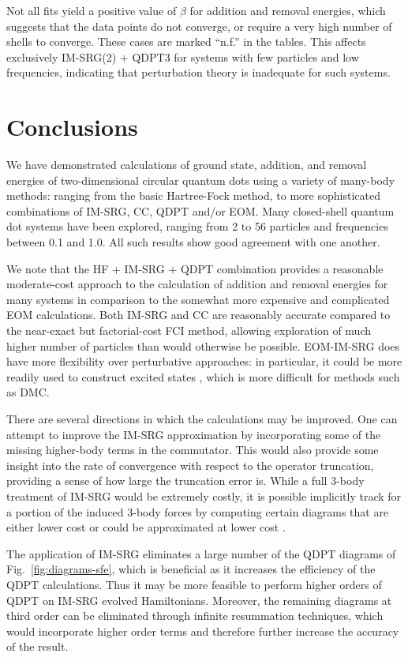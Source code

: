 Not all fits yield a positive value of $\beta$ for addition and
removal energies, which suggests that the data points do not converge,
or require a very high number of shells to converge.  These cases are
marked ``n.f.'' in the tables.  This affects exclusively IM-SRG(2) +
QDPT3 for systems with few particles and low frequencies, indicating
that perturbation theory is inadequate for such systems.

\section{Conclusions}
\label{sec:conclusions}

We have demonstrated calculations of ground state, addition, and
removal energies of two-dimensional circular quantum dots using a
variety of many-body methods: ranging from the basic Hartree-Fock
method, to more sophisticated combinations of IM-SRG, CC, QDPT and/or
EOM.  Many closed-shell quantum dot systems have been explored,
ranging from 2 to 56 particles and frequencies between 0.1 and 1.0.
All such results show good agreement with one another.

We note that the HF + IM-SRG + QDPT combination provides a reasonable
moderate-cost approach to the calculation of addition and removal
energies for many systems in comparison to the somewhat more expensive
and complicated EOM calculations.  Both IM-SRG and CC are reasonably
accurate compared to the near-exact but factorial-cost FCI method,
allowing exploration of much higher number of particles than would
otherwise be possible.  EOM-IM-SRG does have more flexibility over
perturbative approaches: in particular, it could be more readily used
to construct excited states \cite{2016arXiv161100661P}, which is more
difficult for methods such as DMC.

There are several directions in which the calculations may be
improved.  One can attempt to improve the IM-SRG approximation by
incorporating some of the missing higher-body terms in the commutator.
This would also provide some insight into the rate of convergence with
respect to the operator truncation, providing a sense of how large the
truncation error is.  While a full 3-body treatment of IM-SRG would be
extremely costly, it is possible implicitly track for a portion of the
induced 3-body forces by computing certain diagrams that are either
lower cost or could be approximated at lower cost \cite{IMSRG}.

The application of IM-SRG eliminates a large number of the QDPT
diagrams of Fig.~\ref{fig:diagrams-sfe}, which is beneficial as it increases
the efficiency of the QDPT calculations.  Thus it may be more feasible
to perform higher orders of QDPT on IM-SRG evolved Hamiltonians.
Moreover, the remaining diagrams at third order can be eliminated
through infinite resummation techniques, which would incorporate
higher order terms and therefore further increase the accuracy of the
result.

